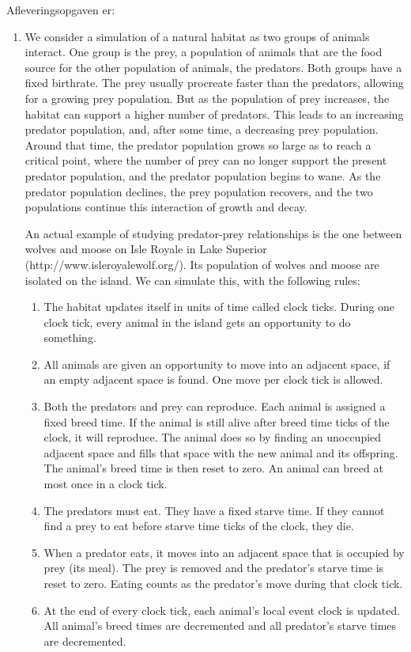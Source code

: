 \documentclass[a4paper,12pt]{article}
\begin{document}
Afleveringsopgaven er:
\begin{enumerate}[label=10g.\arabic*,start=0]
\item We consider a simulation of a natural habitat as two groups of animals interact. One group is the prey, a population of animals that are the food source for the other population of animals, the predators. Both groups have a fixed birthrate. The prey usually procreate faster than the predators, allowing for a growing prey population. But as the population of prey increases, the habitat can support a higher number of predators. This leads to an increasing predator population, and, after some time, a decreasing prey population. Around that time, the predator population grows so large as to reach a critical point, where the number of prey can no longer support the present predator population, and the predator population begins to wane. As the predator population declines, the prey population recovers, and the two populations continue this interaction of growth and decay.

  An actual example of studying predator-prey relationships is the one between wolves and moose on Isle Royale in Lake Superior (http://www.isleroyalewolf.org/). Its population of wolves and moose are isolated on the island. We can simulate this, with the following rules:
  \begin{enumerate}
  \item The habitat updates itself in units of time called clock ticks. During one clock tick, every animal in the island gets an opportunity to do something. 
  \item All animals are given an opportunity to move into an adjacent space, if an empty adjacent space is found. One move per clock tick is allowed.
  \item Both the predators and prey can reproduce. Each animal is assigned a fixed breed time. If the animal is still alive after breed time ticks of the clock, it will reproduce. The animal does so by finding an unoccupied adjacent space and fills that space with the new animal and its offspring. The animal's breed time is then reset to zero. An animal can breed at most once in a clock tick.
  \item The predators must eat. They have a fixed starve time. If they cannot find a prey to eat before starve time ticks of the clock, they die.
  \item When a predator eats, it moves into an adjacent space that is occupied by prey (its meal). The prey is removed and the predator's starve time is reset to zero. Eating counts as the predator's move during that clock tick.
  \item At the end of every clock tick, each animal's local event clock is updated. All animal's breed times are decremented and all predator's starve times are decremented.
  \end{enumerate}
\end{enumerate}
\end{document}
